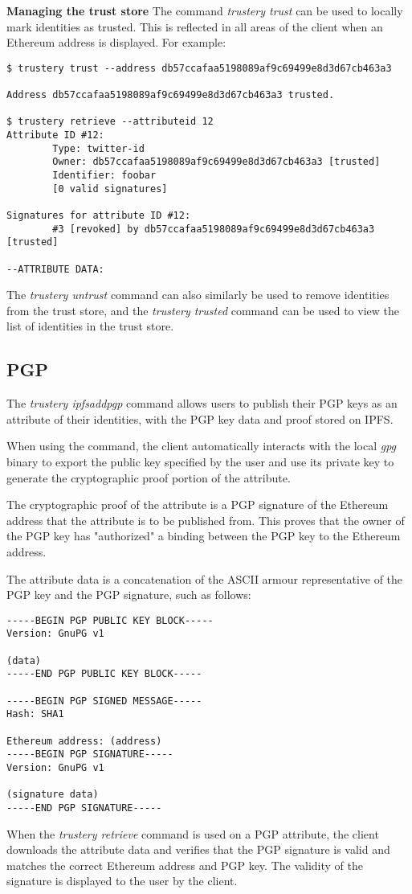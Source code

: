\documentclass[12pt,a4paper]{report}
\begin{document}
	\bigskip
	\noindent \textbf{Managing the trust store}\newline
	The command \textit{trustery trust} can be used to locally mark identities as trusted. This is reflected in all areas of the client when an Ethereum address is displayed. For example:
	\begin{lstlisting}
$ trustery trust --address db57ccafaa5198089af9c69499e8d3d67cb463a3

Address db57ccafaa5198089af9c69499e8d3d67cb463a3 trusted.

$ trustery retrieve --attributeid 12
Attribute ID #12:
        Type: twitter-id
        Owner: db57ccafaa5198089af9c69499e8d3d67cb463a3 [trusted]
        Identifier: foobar
        [0 valid signatures]

Signatures for attribute ID #12:
        #3 [revoked] by db57ccafaa5198089af9c69499e8d3d67cb463a3 [trusted]

--ATTRIBUTE DATA:

	\end{lstlisting}
	The \textit{trustery untrust} command can also similarly be used to remove identities from the trust store, and the \textit{trustery trusted} command can be used to view the list of identities in the trust store.
	
	\subsection{PGP}
	The \textit{trustery ipfsaddpgp} command allows users to publish their PGP keys as an attribute of their identities, with the PGP key data and proof stored on IPFS.
	
	When using the command, the client automatically interacts with the local \textit{gpg} binary to export the public key specified by the user and use its private key to generate the cryptographic proof portion of the attribute.
	
	The cryptographic proof of the attribute is a PGP signature of the Ethereum address that the attribute is to be published from. This proves that the owner of the PGP key has "authorized" a binding between the PGP key to the Ethereum address.
	
	The attribute data is a concatenation of the ASCII armour representative of the PGP key and the PGP signature, such as follows:
	\begin{lstlisting}
-----BEGIN PGP PUBLIC KEY BLOCK-----
Version: GnuPG v1

(data)
-----END PGP PUBLIC KEY BLOCK-----

-----BEGIN PGP SIGNED MESSAGE-----
Hash: SHA1

Ethereum address: (address)
-----BEGIN PGP SIGNATURE-----
Version: GnuPG v1

(signature data)
-----END PGP SIGNATURE-----
	\end{lstlisting}
	When the \textit{trustery retrieve} command is used on a PGP attribute, the client downloads the attribute data and verifies that the PGP signature is valid and matches the correct Ethereum address and PGP key. The validity of the signature is displayed to the user by the client.
	
\end{document}
